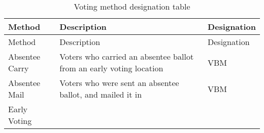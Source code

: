 \documentclass[12pt,twoside]{reedthesis}
\begin{document}
  \begin{longtable}[]{@{}lll@{}}
  \caption{Voting method designation table
  \label{tab:voting_method}}\tabularnewline
  \toprule
  \begin{minipage}[b]{0.13\columnwidth}\raggedright\strut
  Method\strut
  \end{minipage} & \begin{minipage}[b]{0.62\columnwidth}\raggedright\strut
  Description\strut
  \end{minipage} & \begin{minipage}[b]{0.16\columnwidth}\raggedright\strut
  Designation\strut
  \end{minipage}\tabularnewline
  \midrule
  \endfirsthead
  \toprule
  \begin{minipage}[b]{0.13\columnwidth}\raggedright\strut
  Method\strut
  \end{minipage} & \begin{minipage}[b]{0.62\columnwidth}\raggedright\strut
  Description\strut
  \end{minipage} & \begin{minipage}[b]{0.16\columnwidth}\raggedright\strut
  Designation\strut
  \end{minipage}\tabularnewline
  \midrule
  \endhead
  \begin{minipage}[t]{0.13\columnwidth}\raggedright\strut
  Absentee Carry\strut
  \end{minipage} & \begin{minipage}[t]{0.62\columnwidth}\raggedright\strut
  Voters who carried an absentee ballot from an early voting
  location\strut
  \end{minipage} & \begin{minipage}[t]{0.16\columnwidth}\raggedright\strut
  VBM\strut
  \end{minipage}\tabularnewline
  \begin{minipage}[t]{0.13\columnwidth}\raggedright\strut
  Absentee Mail\strut
  \end{minipage} & \begin{minipage}[t]{0.62\columnwidth}\raggedright\strut
  Voters who were sent an absentee ballot, and mailed it in\strut
  \end{minipage} & \begin{minipage}[t]{0.16\columnwidth}\raggedright\strut
  VBM\strut
  \end{minipage}\tabularnewline
  \begin{minipage}[t]{0.13\columnwidth}\raggedright\strut
  Early Voting\strut
  \end{minipage} & \begin{minipage}[t]{0.62\columnwidth}\raggedright\strut

\end{minipage}
\end{longtable}
\end{document}

